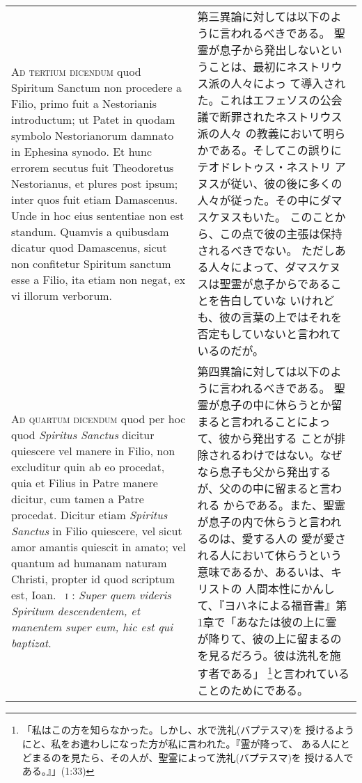 \documentclass[10pt]{jsarticle} %
\begin{document}
\begin{longtable}{p{21em}p{21em}}
\\



{\scshape Ad tertium dicendum} quod  Spiritum Sanctum non procedere a Filio, primo
fuit a Nestorianis introductum; ut Patet in quodam symbolo
Nestorianorum damnato in Ephesina synodo. Et hunc errorem secutus fuit
Theodoretus Nestorianus, et plures post ipsum; inter quos fuit etiam
Damascenus. Unde in hoc eius sententiae non est standum. Quamvis a
quibusdam dicatur quod Damascenus, sicut non confitetur  Spiritum
sanctum esse a Filio, ita etiam non negat, ex vi illorum verborum.

&

第三異論に対しては以下のように言われるべきである。
聖霊が息子から発出しないということは、最初にネストリウス派の人々によっ
 て導入された。これはエフェソスの公会議で断罪されたネストリウス派の人々
 の教義において明らかである。そしてこの誤りにテオドレトゥス・ネストリ
 アヌスが従い、彼の後に多くの人々が従った。その中にダマスケヌスもいた。
 このことから、この点で彼の主張は保持されるべきでない。
ただしある人々によって、ダマスケヌスは聖霊が息子からであることを告白していな
いけれども、彼の言葉の上ではそれを否定もしていないと言われているのだが。


\\



{\scshape Ad quartum dicendum} quod per hoc quod {\itshape  Spiritus Sanctus}
dicitur quiescere vel manere in Filio, non excluditur quin ab eo
procedat, quia et Filius in Patre manere dicitur, cum tamen a Patre
procedat. Dicitur etiam {\itshape  Spiritus Sanctus} in Filio
quiescere, vel sicut amor amantis quiescit in amato; vel quantum ad
humanam naturam Christi, propter id quod scriptum est, Ioan.~{\scshape
 i} : {\itshape Super
quem videris  Spiritum descendentem, et manentem super eum, hic est qui
baptizat}.

&

第四異論に対しては以下のように言われるべきである。
聖霊が息子の中に休らうとか留まると言われることによって、彼から発出する
 ことが排除されるわけではない。なぜなら息子も父から発出するが、父のの中に留まると言われる
 からである。また、聖霊が息子の内で休らうと言われるのは、愛する人の
 愛が愛される人において休らうという意味であるか、あるいは、キリストの
 人間本性にかんして、『ヨハネによる福音書』第1章で「あなたは彼の上に霊
 が降りて、彼の上に留まるのを見るだろう。彼は洗礼を施す者である」
 \footnote{「私はこの方を知らなかった。しかし、水で洗礼(バプテスマ)を
 授けるようにと、私をお遣わしになった方が私に言われた。『霊が降って、
 ある人にとどまるのを見たら、その人が、聖霊によって洗礼(バプテスマ)を
 授ける人である。』」(1:33)}と言われていることのためにである。




\end{longtable}
\end{document}
